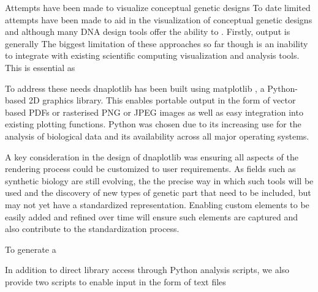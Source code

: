 \documentclass{bioinfo}
\begin{document}

Attempts have been made to visualize conceptual genetic designs 
To date limited attempts have been made to aid in the visualization of conceptual genetic designs \citep{Bhatia13a} and although many DNA design tools offer the ability to . Firstly, output is generally 
The biggest limitation of these approaches so far though is an inability to integrate with existing scientific computing visualization and analysis tools. This is essential as 








To address these needs dnaplotlib has been built using matplotlib \citep{Hunter07a}, a Python-based 2D graphics library. This enables portable output in the form of vector based PDFs or rasterised PNG or JPEG images as well as easy integration into existing plotting functions. Python was chosen due to its increasing use for the analysis of biological data \citep{Cock09a} and its availability across all major operating systems.

A key consideration in the design of dnaplotlib was ensuring all aspects of the rendering process could be customized to user requirements. As fields such as synthetic biology are still evolving, the the precise way in which such tools will be used and the discovery of new types of genetic part that need to be included, but may not yet have a standardized representation. Enabling custom elements to be easily added and refined over time will ensure such elements are captured and also contribute to the standardization process. 

To generate a 

In addition to direct library access through Python analysis scripts, we also provide two scripts to enable input in the form of text files
\end{document}
